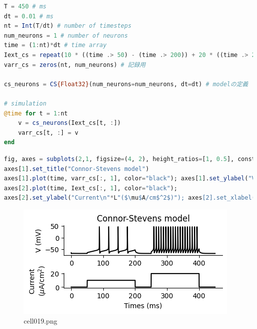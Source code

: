 \begin{lstlisting}[language=julia]
T = 450 # ms
dt = 0.01 # ms
nt = Int(T/dt) # number of timesteps
num_neurons = 1 # number of neurons
time = (1:nt)*dt # time array
Iext_cs = repeat(10 * ((time .> 50) - (time .> 200)) + 20 * ((time .> 250) - (time .> 400)), 1, num_neurons)  # injection current
varr_cs = zeros(nt, num_neurons) # 記録用

cs_neurons = CS{Float32}(num_neurons=num_neurons, dt=dt) # modelの定義

# simulation
@time for t = 1:nt
    v = cs_neurons(Iext_cs[t, :])
    varr_cs[t, :] = v
end
\end{lstlisting}
\begin{lstlisting}[language=julia]
fig, axes = subplots(2,1, figsize=(4, 2), height_ratios=[1, 0.5], constrained_layout=true) 
axes[1].set_title("Connor-Stevens model")
axes[1].plot(time, varr_cs[:, 1], color="black"); axes[1].set_ylabel("V (mV)")
axes[2].plot(time, Iext_cs[:, 1], color="black"); 
axes[2].set_ylabel("Current\n"*L"($\mu$A/cm$^2$)"); axes[2].set_xlabel("Times (ms)")
\end{lstlisting}
\begin{figure}[ht]
	\centering
	\includegraphics[scale=0.8, max width=\linewidth]{./fig/neuron-model/hodgkin-huxley/cell019.png}
	\caption{cell019.png}
	\label{cell019.png}
\end{figure}
